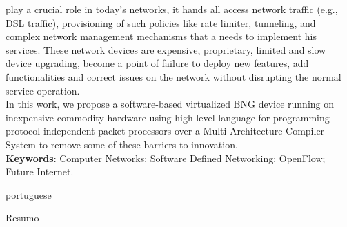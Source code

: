 \begin{resumo}
    \vspace{\onelineskip}
 play a crucial role in today’s networks, it hands all access network traffic (e.g., DSL traffic), provisioning of such policies like rate limiter, tunneling, and complex network management mechanisms that a  needs to implement his services. These network devices are expensive, proprietary, limited and slow device upgrading, become a point of failure to deploy new features, add functionalities and correct issues on the network without disrupting the normal service operation.\\
In this work, we propose a software-based virtualized BNG device running on inexpensive commodity hardware using high-level language for programming protocol-independent packet processors over a  Multi-Architecture Compiler System to remove some of these barriers to innovation.\\


    \noindent\textbf{Keywords}: Computer Networks; Software Defined Networking; OpenFlow; Future Internet.

    \pagebreak

    \begin{otherlanguage*}{portuguese}
    \begin{center}{\ABNTEXchapterfont\huge Resumo}\end{center}
    

\end{otherlanguage*}
\end{resumo}
